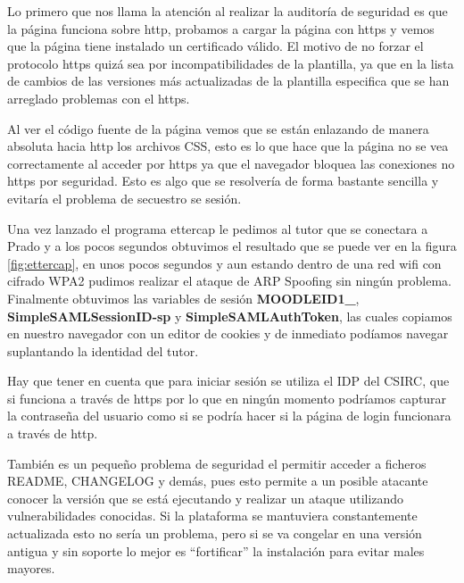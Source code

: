 Lo primero que nos llama la atención al realizar la auditoría de seguridad es que la página funciona sobre http, probamos a cargar la página con https y vemos que la página tiene instalado un certificado válido. El motivo de no forzar el protocolo https quizá sea por incompatibilidades de la plantilla, ya que en la lista de cambios de las versiones más actualizadas de la plantilla especifica que se han arreglado problemas con el https\cite{art_11}.

\bigskip
Al ver el código fuente de la página vemos que se están enlazando de manera absoluta hacia http los archivos CSS, esto es lo que hace que la página no se vea correctamente al acceder por https ya que el navegador bloquea las conexiones no https por seguridad. Esto es algo que se resolvería de forma bastante sencilla y evitaría el problema de secuestro se sesión.

\bigskip
Una vez lanzado el programa ettercap le pedimos al tutor que se conectara a Prado y a los pocos segundos obtuvimos el resultado que se puede ver en la figura \ref{fig:ettercap}, en unos pocos segundos y aun estando dentro de una red wifi con cifrado WPA2 pudimos realizar el ataque de ARP Spoofing sin ningún problema. Finalmente obtuvimos las variables de sesión \textbf{MOODLEID1\_}, \textbf{SimpleSAMLSessionID-sp} y \textbf{SimpleSAMLAuthToken}, las cuales copiamos en nuestro navegador con un editor de cookies y de inmediato podíamos navegar suplantando la identidad del tutor.

\bigskip
Hay que tener en cuenta que para iniciar sesión se utiliza el IDP del CSIRC, que si funciona a través de https por lo que en ningún momento podríamos capturar la contraseña del usuario como si se podría hacer si la página de login funcionara a través de http.

\bigskip
También es un pequeño problema de seguridad el permitir acceder a ficheros README, CHANGELOG y demás, pues esto permite a un posible atacante conocer la versión que se está ejecutando y realizar un ataque utilizando vulnerabilidades conocidas. Si la plataforma se mantuviera constantemente actualizada esto no sería un problema, pero si se va congelar en una versión antigua y sin soporte lo mejor es ``fortificar'' la instalación para evitar males mayores.

